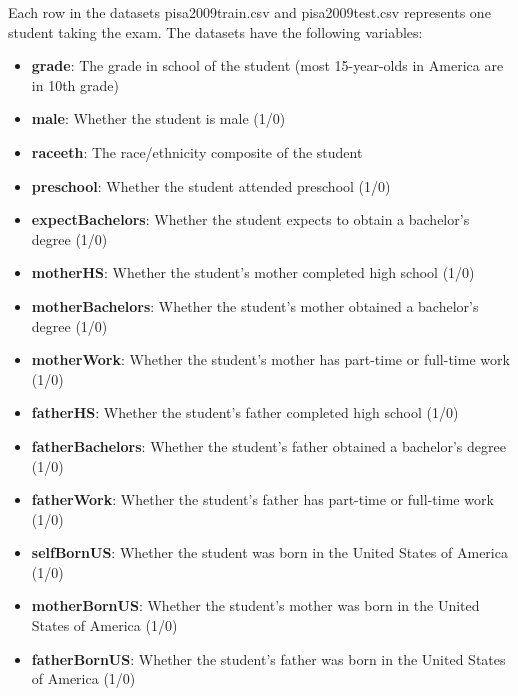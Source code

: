 \documentclass[letterpaper, 9pt, onecolumn, twoside, technote, final]{IEEEtran}
\begin{document}
Each row in the datasets pisa2009train.csv and pisa2009test.csv
represents one student taking the exam. The datasets have the
following variables:

\begin{itemize}
\item \textbf{grade}: The grade in school of the student (most 15-year-olds in
America are in 10th grade)

\item \textbf{male}: Whether the student is male (1/0)

\item \textbf{raceeth}: The race/ethnicity composite of the student

\item \textbf{preschool}: Whether the student attended preschool (1/0)

\item \textbf{expectBachelors}: Whether the student expects to obtain a
bachelor's degree (1/0)

\item \textbf{motherHS}: Whether the student's mother completed high school (1/0)

\item \textbf{motherBachelors}: Whether the student's mother obtained a
bachelor's degree (1/0)

\item \textbf{motherWork}: Whether the student's mother has part-time or
full-time work (1/0)

\item \textbf{fatherHS}: Whether the student's father completed high school (1/0)

\item \textbf{fatherBachelors}: Whether the student's father obtained a
bachelor's degree (1/0)

\item \textbf{fatherWork}: Whether the student's father has part-time or
full-time work (1/0)

\item \textbf{selfBornUS}: Whether the student was born in the United States of
America (1/0)

\item \textbf{motherBornUS}: Whether the student's mother was born in the United
States of America (1/0)

\item \textbf{fatherBornUS}: Whether the student's father was born in the United
States of America (1/0)


\end{itemize}
\end{document}
